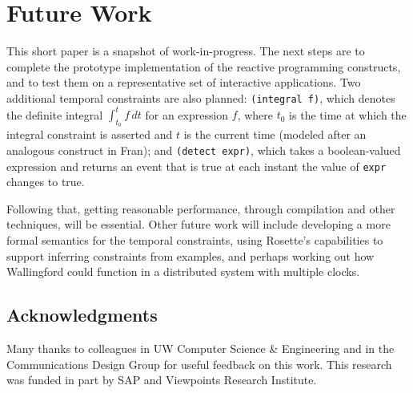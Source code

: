 \documentclass{sig-alternate-05-2015}
\begin{document}
\section{Future Work}

This short paper is a snapshot of work-in-progress.  The next steps are to
complete the prototype implementation of the reactive programming
constructs, and to test them on a representative set of interactive
applications.  Two additional temporal constraints are also planned:
\verb|(integral f)|, which denotes the definite integral 
$\int_{t_0}^t f \, dt$ for an expression $f$, where $t_0$ is the time
at which the integral constraint is asserted and $t$ is the current
time (modeled after an analogous construct in Fran); and
\verb|(detect expr)|, which takes a boolean-valued expression and
returns an event that is true at each instant the value of \verb|expr|
changes to true.

Following that, getting reasonable performance, through compilation and
other techniques, will be essential.  Other future work will include
developing a more formal semantics for the temporal constraints, using
Rosette's capabilities to support inferring constraints from examples, and
perhaps working out how Wallingford could function in a distributed system
with multiple clocks.

\subsection*{Acknowledgments}
Many thanks to colleagues in UW Computer Science \& Engineering and in
the Communications Design Group for useful feedback on this work.  This
research was funded in part by SAP and Viewpoints Research Institute.

\newpage



\end{document}
